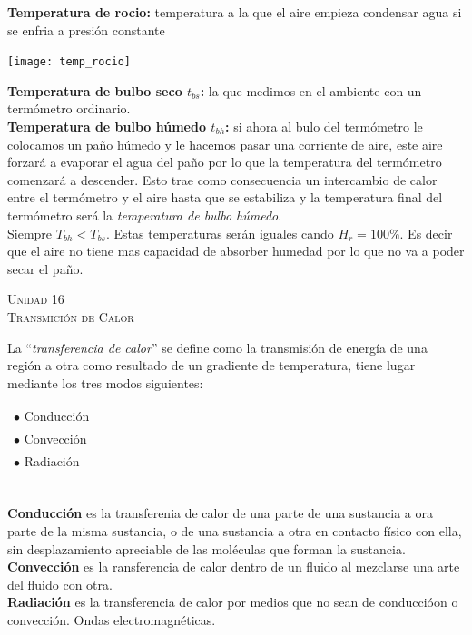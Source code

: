 \documentclass[11pt,a4paper,twocolumn]{article}
\newcommand{\unidad}[2]{\begin{center}
		\fontsize{10}{10}\selectfont\color{gray!50!black}\scshape Unidad #1 \\
		\fontsize{14}{14}\selectfont \scshape #2
\end{center}}
\begin{document}
	\textbf{Temperatura de rocio:} temperatura a la que el aire empieza  condensar agua si se enfria a presión constante
	
	\begin{center}
		\texttt{[image: temp\_rocio]}
	\end{center}
	
	\textbf{Temperatura de bulbo seco $t_{bs}$:} la que medimos en el ambiente con un termómetro ordinario. \\
	
	\textbf{Temperatura de bulbo húmedo $t_{bh}$:} si ahora al bulo del termómetro le colocamos un paño húmedo y le hacemos pasar una corriente de aire, este aire forzará a evaporar el agua del paño por lo que la temperatura del termómetro comenzará a descender. Esto trae como consecuencia un intercambio de calor entre el termómetro y el aire hasta que se estabiliza y la temperatura final del termómetro será la \emph{temperatura de bulbo húmedo}.\\
	
	Siempre $T_{bh} < T_{bs}$. Estas temperaturas serán iguales cando $H_r = 100\%$. Es decir que el aire no tiene mas capacidad de absorber humedad por lo que no va a poder secar el paño.
	
		
	
	
		\unidad{16}{Transmición de Calor}
		La ``\textit{transferencia de calor}'' se define como la transmisión de energía de una región a otra como resultado de un gradiente de temperatura, tiene lugar mediante los tres modos siguientes:
	
	\begin{tabular}{l}
		$\bullet$	Conducción\\
		$\bullet$	Convección\\
		$\bullet$	Radiación
	\end{tabular}\\
	
	\textbf{Conducción} es la transferenia de calor de una parte de una sustancia a ora parte de la misma sustancia, o de una sustancia a otra en contacto físico con ella, sin desplazamiento apreciable de las moléculas que forman la sustancia.\\
	\textbf{Convección} es la ransferencia de calor dentro de un fluido al mezclarse una arte del fluido con otra.\\
	\textbf{Radiación} es la transferencia de calor por medios que no sean de conduccióon o convección. Ondas electromagnéticas.\\
	
\end{document}
